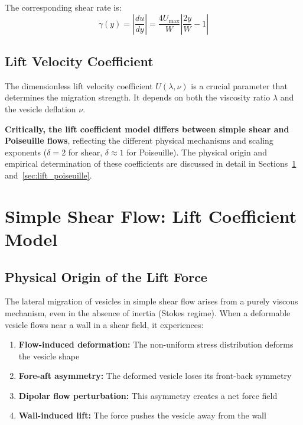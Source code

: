 \documentclass{article}
\begin{document}
The corresponding shear rate is:
\begin{equation}
    \dot{\gamma}(y) = \left| \frac{du}{dy} \right| = \frac{4 U_{\max}}{W} \left| \frac{2y}{W} - 1 \right|
    \label{eq:shear_rate}
\end{equation}

\subsection{Lift Velocity Coefficient}

The dimensionless lift velocity coefficient $U(\lambda, \nu)$ is a crucial parameter that determines the migration strength. It depends on both the viscosity ratio $\lambda$ and the vesicle deflation $\nu$. 

\textbf{Critically, the lift coefficient model differs between simple shear and Poiseuille flows}, reflecting the different physical mechanisms and scaling exponents ($\delta = 2$ for shear, $\delta \approx 1$ for Poiseuille). The physical origin and empirical determination of these coefficients are discussed in detail in Sections~\ref{sec:lift_shear} and~\ref{sec:lift_poiseuille}.

\section{Simple Shear Flow: Lift Coefficient Model}
\label{sec:lift_shear}

\subsection{Physical Origin of the Lift Force}

The lateral migration of vesicles in simple shear flow arises from a purely viscous mechanism, even in the absence of inertia (Stokes regime). When a deformable vesicle flows near a wall in a shear field, it experiences:

\begin{enumerate}
    \item \textbf{Flow-induced deformation:} The non-uniform stress distribution deforms the vesicle shape
    \item \textbf{Fore-aft asymmetry:} The deformed vesicle loses its front-back symmetry
    \item \textbf{Dipolar flow perturbation:} This asymmetry creates a net force field
    \item \textbf{Wall-induced lift:} The force pushes the vesicle away from the wall
\end{enumerate}
\end{document}
